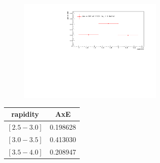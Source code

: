 \begin{figure}[!h]
\begin{center}
  \includegraphics[height=5.0cm]{RAA/AxE/Indra_MC_AxE_2016_06_08/AxE_rap.pdf}%
\end{center}
\end{figure}


\begin{tabular} { c | c }
  \hline
  rapidity   & AxE  \\\hline
  $[2.5-3.0]$   & 0.198628 \\
  $[3.0-3.5]$  & 0.413030 \\
  $[3.5-4.0]$  & 0.208947 \\\hline
\end{tabular}

